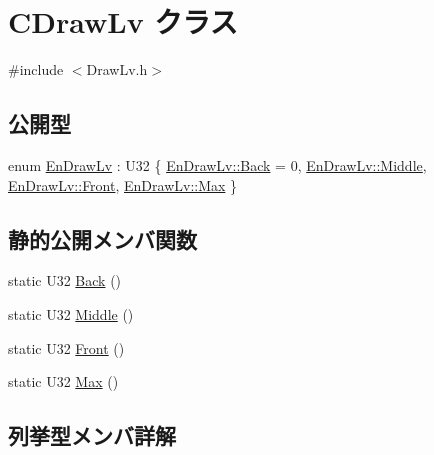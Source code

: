 \hypertarget{class_c_draw_lv}{}\section{C\+Draw\+Lv クラス}
\label{class_c_draw_lv}


{\ttfamily \#include $<$Draw\+Lv.\+h$>$}

\subsection*{公開型}
\begin{DoxyCompactItemize}
\item 
enum \hyperlink{class_c_draw_lv_a45316dff9df4c5a2991f1eb0ca758ae9}{En\+Draw\+Lv} \+: U32 \{ \hyperlink{class_c_draw_lv_a45316dff9df4c5a2991f1eb0ca758ae9a0557fa923dcee4d0f86b1409f5c2167f}{En\+Draw\+Lv\+::\+Back} = 0, 
\hyperlink{class_c_draw_lv_a45316dff9df4c5a2991f1eb0ca758ae9ab1ca34f82e83c52b010f86955f264e05}{En\+Draw\+Lv\+::\+Middle}, 
\hyperlink{class_c_draw_lv_a45316dff9df4c5a2991f1eb0ca758ae9a5835bab1ade0060909e31a06af2e2cde}{En\+Draw\+Lv\+::\+Front}, 
\hyperlink{class_c_draw_lv_a45316dff9df4c5a2991f1eb0ca758ae9a6a061313d22e51e0f25b7cd4dc065233}{En\+Draw\+Lv\+::\+Max}
 \}
\end{DoxyCompactItemize}
\subsection*{静的公開メンバ関数}
\begin{DoxyCompactItemize}
\item 
static U32 \hyperlink{class_c_draw_lv_ab612b9c3b7b7b5c50267d3020231d874}{Back} ()
\item 
static U32 \hyperlink{class_c_draw_lv_a505ac52f3df1c06de45de912601c3b2a}{Middle} ()
\item 
static U32 \hyperlink{class_c_draw_lv_abe93b0ac399cf46bb9f142eca58f1764}{Front} ()
\item 
static U32 \hyperlink{class_c_draw_lv_affca7747ae2c87b67f06223d89b3eb1f}{Max} ()
\end{DoxyCompactItemize}


\subsection{列挙型メンバ詳解}
\hypertarget{class_c_draw_lv_a45316dff9df4c5a2991f1eb0ca758ae9}{}
